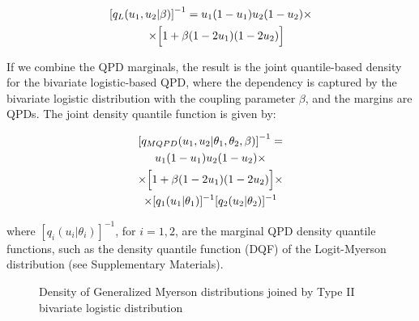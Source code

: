 \documentclass[
  fleqn,
  deca,
  blindrev
]{informs4}
\begin{document}
\[
\begin{gathered}
\left[q_L(u_1,u_2\vert\beta)\right]^{-1}=u_1(1-u_1)u_2(1-u_2)\times\\
\quad\times \Bigl[1+\beta (1-2u_1)(1-2u_2)\Bigr]
\end{gathered}
\]

If we combine the QPD marginals, the result is the joint quantile-based
density for the bivariate logistic-based QPD, where the dependency is
captured by the bivariate logistic distribution with the coupling
parameter \(\beta\), and the margins are QPDs. The joint density
quantile function is given by:

\[
\begin{gathered}
\left[q_{MQPD}(u_1,u_2\vert\theta_1,\theta_2, \beta)\right]^{-1}=\\
u_1(1-u_1)u_2(1-u_2)\times\\
\times\Bigl[1+\beta (1-2u_1)(1-2u_2)\Bigr]\times\\
\times [q_1(u_1\vert\theta_1)]^{-1}[q_2(u_2\vert\theta_2)]^{-1}
\end{gathered}
\]

where \([q_i(u_i\vert\theta_i)]^{-1}\), for \(i=1,2\), are the marginal
QPD density quantile functions, such as the density quantile function
(DQF) of the Logit-Myerson distribution (see Supplementary Materials).

\begin{figure}


\caption{\label{fig-bi-logitmyerson}Density of Generalized Myerson
distributions joined by Type II bivariate logistic distribution}

\end{figure}%
\end{document}
